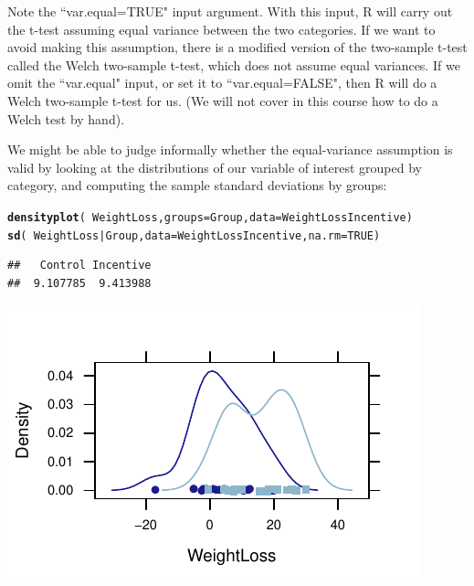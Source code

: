 \documentclass[twoside]{book}\usepackage[]{graphicx}\usepackage[]{xcolor}
\makeatletter
\def\maxwidth{ %
  \ifdim\Gin@nat@width>\linewidth
    \linewidth
  \else
    \Gin@nat@width
  \fi
}
\newcommand{\hlnum}[1]{\textcolor[rgb]{0.686,0.059,0.569}{#1}}%
\newcommand{\hlopt}[1]{\textcolor[rgb]{0,0,0}{#1}}%
\newcommand{\hlstd}[1]{\textcolor[rgb]{0.345,0.345,0.345}{#1}}%
\newcommand{\hlkwc}[1]{\textcolor[rgb]{0.333,0.667,0.333}{#1}}%
\newcommand{\hlkwd}[1]{\textcolor[rgb]{0.737,0.353,0.396}{\textbf{#1}}}%
\newenvironment{kframe}{%
 \def\at@end@of@kframe{}%
 \ifinner\ifhmode%
  \def\at@end@of@kframe{\end{minipage}}%
  \begin{minipage}{\columnwidth}%
 \fi\fi%
 \def\FrameCommand##1{\hskip\@totalleftmargin \hskip-\fboxsep
 \colorbox{shadecolor}{##1}\hskip-\fboxsep
     \hskip-\linewidth \hskip-\@totalleftmargin \hskip\columnwidth}%
 \MakeFramed {\advance\hsize-\width
   \@totalleftmargin\z@ \linewidth\hsize
   \@setminipage}}%
 {\par\unskip\endMakeFramed%
 \at@end@of@kframe}
\newenvironment{knitrout}{}{} %
\makeatother
\begin{document}
Note the ``var.equal=TRUE" input argument.  With this input, R will carry out the t-test assuming equal variance between the two categories.  If we want to avoid making this assumption, there is a modified version of the two-sample t-test called the Welch two-sample t-test, which does not assume equal variances.  If we omit the ``var.equal" input, or set it to ``var.equal=FALSE", then R will do a Welch two-sample t-test for us. (We will not cover in this course how to do a Welch test by hand).

We might be able to judge informally whether the equal-variance assumption is valid by looking at the distributions of our variable of interest grouped by category, and computing the sample standard deviations by groups:
\begin{knitrout}
\color{fgcolor}\begin{kframe}
\begin{alltt}
\hlkwd{densityplot}\hlstd{(}\hlopt{~}\hlstd{WeightLoss,} \hlkwc{groups} \hlstd{= Group,} \hlkwc{data} \hlstd{= WeightLossIncentive)}
\hlkwd{sd}\hlstd{(}\hlopt{~}\hlstd{WeightLoss} \hlopt{|} \hlstd{Group,} \hlkwc{data} \hlstd{= WeightLossIncentive,} \hlkwc{na.rm} \hlstd{=} \hlnum{TRUE}\hlstd{)}
\end{alltt}
\begin{verbatim}
##   Control Incentive 
##  9.107785  9.413988
\end{verbatim}
\end{kframe}

{\centering \includegraphics[width=\maxwidth]{figures/fig-unnamed-chunk-253-1} 

}



\end{knitrout}
\end{document}
